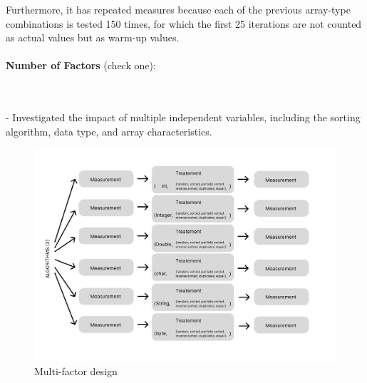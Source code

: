\documentclass{article}
\begin{document}
Furthermore, it has repeated measures because each of the previous array-type combinations is tested 150 times, for which the first 25 iterations are not counted as actual values but as warm-up values.
\\\\
\textbf{Number of Factors} (check one):\\
\noindent
\begin{minipage}{0.4\textwidth}
\end{minipage}%
\begin{minipage}{0.4\textwidth}
\end{minipage}%
\begin{minipage}{0.0\textwidth}
\end{minipage}\\\\
- Investigated the impact of multiple independent variables, including the sorting algorithm, data type, and array characteristics.
\begin{figure}[H]
    \centering
    \includegraphics[width=\textwidth]{./data/Group12.png}
    \caption{Multi-factor design}
\end{figure}
\end{document}
